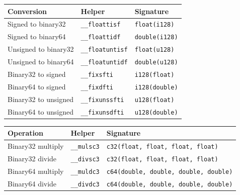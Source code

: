 \documentclass[10pt,twoside]{article}
\begin{document}
\begingroup\footnotesize
\setlength{\tabcolsep}{2pt}
\begin{longtable}{@{}p{1.55in}p{1.55in}p{2.45in}@{}}
\toprule
\textbf{Conversion} & \textbf{Helper} & \textbf{Signature}\\
\midrule
\endhead
Signed to binary32 & \texttt{\_\allowbreak{}\_\allowbreak{}floattisf} & \texttt{float(i128)}\\
Signed to binary64 & \texttt{\_\allowbreak{}\_\allowbreak{}floattidf} & \texttt{double(i128)}\\
Unsigned to binary32 & \texttt{\_\allowbreak{}\_\allowbreak{}floatuntisf} & \texttt{float(u128)}\\
Unsigned to binary64 & \texttt{\_\allowbreak{}\_\allowbreak{}floatuntidf} & \texttt{double(u128)}\\
Binary32 to signed & \texttt{\_\allowbreak{}\_\allowbreak{}fixsfti} & \texttt{i128(float)}\\
Binary64 to signed & \texttt{\_\allowbreak{}\_\allowbreak{}fixdfti} & \texttt{i128(double)}\\
Binary32 to unsigned & \texttt{\_\allowbreak{}\_\allowbreak{}fixunssfti} & \texttt{u128(float)}\\
Binary64 to unsigned & \texttt{\_\allowbreak{}\_\allowbreak{}fixunsdfti} & \texttt{u128(double)}\\
\bottomrule
\end{longtable}
\endgroup

\begingroup\footnotesize
\setlength{\tabcolsep}{2pt}
\begin{longtable}{@{}p{1.55in}p{1.55in}p{2.45in}@{}}
\toprule
\textbf{Operation} & \textbf{Helper} & \textbf{Signature}\\
\midrule
\endhead
Binary32 multiply & \texttt{\_\allowbreak{}\_\allowbreak{}mulsc3} & \texttt{c32(float, float, float, float)}\\
Binary32 divide & \texttt{\_\allowbreak{}\_\allowbreak{}divsc3} & \texttt{c32(float, float, float, float)}\\
Binary64 multiply & \texttt{\_\allowbreak{}\_\allowbreak{}muldc3} & \texttt{c64(double, double, double, double)}\\
Binary64 divide & \texttt{\_\allowbreak{}\_\allowbreak{}divdc3} & \texttt{c64(double, double, double, double)}\\
\bottomrule
\end{longtable}
\endgroup
\end{document}
